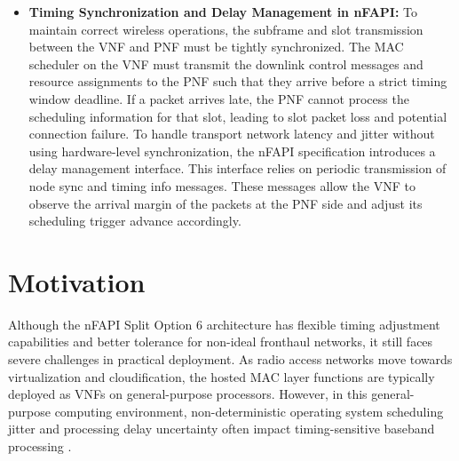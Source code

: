 \documentclass[../my_ntust_thesis.tex]{subfiles}
\begin{document}
\begin{itemize}
According to 3GPP TR 38.801 \cite{3gpp_tr_38_801} specifications, the ideal fronthaul one-way latency limit for Split Option 6 is $250~\mu$s. However, the SCF provides a more practical interpretation for nFAPI's latency tolerance in its specifications \cite{SCF082, SCF225}. The SCF indicates that nFAPI is designed for packet-switched IP networks, and can support highly delayed and highly jittered transmission conditions, tolerating one-way latency ranging from 6 to 30~ms, by employing the built-in delay management mechanism of the nFAPI P7 interface and the SCTP protocol adapted for the P5 interface. This design specifically for non-ideal networks makes Split Option 6 highly practical and flexible in deployment.

\item \textbf{Timing Synchronization and Delay Management in nFAPI:} To maintain correct wireless operations, the subframe and slot transmission between the VNF and PNF must be tightly synchronized. The MAC scheduler on the VNF must transmit the downlink control messages and resource assignments to the PNF such that they arrive before a strict timing window deadline. If a packet arrives late, the PNF cannot process the scheduling information for that slot, leading to slot packet loss and potential connection failure. To handle transport network latency and jitter without using hardware-level synchronization, the nFAPI specification introduces a delay management interface. This interface relies on periodic transmission of node sync and timing info messages. These messages allow the VNF to observe the arrival margin of the packets at the PNF side and adjust its scheduling trigger advance accordingly.
\end{itemize}

\section{Motivation}
\label{sec:motivation}

Although the nFAPI Split Option 6 architecture has flexible timing adjustment capabilities and better tolerance for non-ideal fronthaul networks, it still faces severe challenges in practical deployment. As radio access networks move towards virtualization and cloudification, the hosted MAC layer functions are typically deployed as VNFs on general-purpose processors. However, in this general-purpose computing environment, non-deterministic operating system scheduling jitter and processing delay uncertainty often impact timing-sensitive baseband processing \cite{Foukas2021_ICC, Lee2022}.
\end{document}
